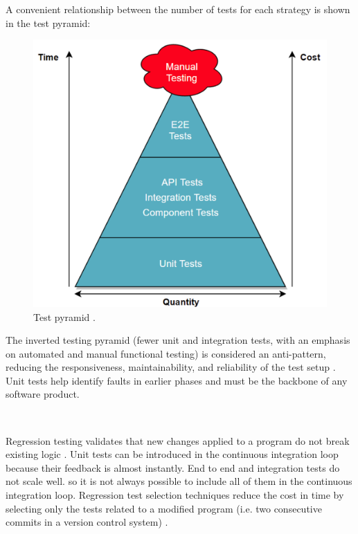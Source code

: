 \documentclass[12pt,english]{article} %
\begin{document}
A convenient relationship between the number of tests for each strategy is shown in the test pyramid:
\begin{figure}[H]
  \centering
  \includegraphics[scale=0.2]{img/test-pyramid.png}
  \caption{Test pyramid \cite{test-pyramid}.}
\end{figure}

The inverted testing pyramid (fewer unit and integration tests, with an emphasis on automated and manual functional testing) is considered an anti-pattern, reducing the responsiveness, maintainability, and reliability of the test setup \cite{test-pyramid}. 
Unit tests help identify faults in earlier phases \cite{test-pyramid} and must be the backbone of any software product.

\

Regression testing validates that new changes applied to a program do not break existing logic \cite{an-overview-of-regression-testing}.
Unit tests can be introduced in the continuous integration loop because their feedback is almost instantly.
End to end and integration tests do not scale well.
so it is not always possible to include all of them in the continuous integration loop.
Regression test selection techniques reduce the cost in time by selecting only the tests related to a modified program (i.e. two consecutive commits in a version control system) \cite{regression-test-selection}.

\
\end{document}

